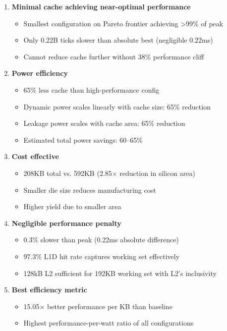 \documentclass[11pt,a4paper]{article}
\begin{document}
\begin{enumerate}[noitemsep]
    \item \textbf{Minimal cache achieving near-optimal performance}
    \begin{itemize}[noitemsep]
        \item Smallest configuration on Pareto frontier achieving >99\% of peak
        \item Only 0.22B ticks slower than absolute best (negligible 0.22ms)
        \item Cannot reduce cache further without 38\% performance cliff
    \end{itemize}

    \item \textbf{Power efficiency}
    \begin{itemize}[noitemsep]
        \item 65\% less cache than high-performance config
        \item Dynamic power scales linearly with cache size: 65\% reduction
        \item Leakage power scales with cache area: 65\% reduction
        \item Estimated total power savings: 60--65\%
    \end{itemize}

    \item \textbf{Cost effective}
    \begin{itemize}[noitemsep]
        \item 208KB total vs. 592KB (2.85× reduction in silicon area)
        \item Smaller die size reduces manufacturing cost
        \item Higher yield due to smaller area
    \end{itemize}

    \item \textbf{Negligible performance penalty}
    \begin{itemize}[noitemsep]
        \item 0.3\% slower than peak (0.22ms absolute difference)
        \item 97.3\% L1D hit rate captures working set effectively
        \item 128kB L2 sufficient for 192KB working set with L2's inclusivity
    \end{itemize}

    \item \textbf{Best efficiency metric}
    \begin{itemize}[noitemsep]
        \item 15.05× better performance per KB than baseline
        \item Highest performance-per-watt ratio of all configurations
    \end{itemize}
\end{enumerate}
\end{document}
